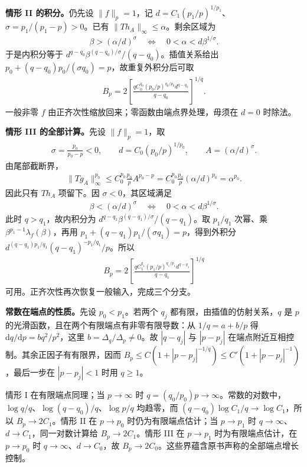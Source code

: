 \documentclass[../../main.tex]{subfiles}
\begin{document}
\begin{remark}
\textbf{情形 II 的积分。}仍先设 $\|f\|_p=1$，记 $d=C_1(p_1/p)^{1/p_1}$、$\sigma=p_1/(p_1-p)>0$。已有 $\|Th_A\|_\infty\leqslant\alpha$。剩余区域为
\begin{align*}
\beta>(\alpha/d)^\sigma\quad\Longleftrightarrow\quad
0<\alpha<d\beta^{1/\sigma}.
\end{align*}
于是内积分等于 $d^{q-q_0}\beta^{(q-q_0)/\sigma}/(q-q_0)$。插值关系给出 $p_0+(q-q_0)p_0/(\sigma q_0)=p$，故重复外积分后可取
\begin{align*}
B_p=2\left[\frac{qC_0^{q_0}(p_0/p)^{q_0/p_0}d^{q-q_0}}{q-q_0}\right]^{1/q}.
\end{align*}
一般非零 $f$ 由正齐次性缩放回来；零函数由端点界处理，毋须在 $d=0$ 时除法。

\textbf{情形 III 的全部计算。}先设 $\|f\|_p=1$，取
\begin{align*}
\sigma=\frac{p_0}{p_0-p}<0,\qquad d=C_0(p_0/p)^{1/p_0},\qquad A=(\alpha/d)^\sigma.
\end{align*}
由尾部截断界，
\begin{align*}
\|Tg_A\|_\infty^{p_0}
\leqslant C_0^{p_0}\frac{p_0}p A^{p_0-p}
=C_0^{p_0}\frac{p_0}p(\alpha/d)^{p_0}=\alpha^{p_0}.
\end{align*}
因此只有 $Th_A$ 项留下。因 $\sigma<0$，其区域满足
\begin{align*}
\beta<(\alpha/d)^\sigma\quad\Longleftrightarrow\quad
0<\alpha<d\beta^{1/\sigma}.
\end{align*}
此时 $q>q_1$，故内积分为 $d^{q-q_1}\beta^{(q-q_1)/\sigma}/(q-q_1)$。取 $p_1/q_1$ 次幂、乘 $\beta^{p_1-1}\lambda_f(\beta)$，再用 $p_1+(q-q_1)p_1/(\sigma q_1)=p$，得到外积分 $d^{(q-q_1)p_1/q_1}(q-q_1)^{-p_1/q_1}/p$。所以
\begin{align*}
B_p=2\left[\frac{qC_1^{q_1}(p_1/p)^{q_1/p_1}d^{q-q_1}}{q-q_1}\right]^{1/q}
\end{align*}
可用。正齐次性再次恢复一般输入，完成三个分支。

\textbf{常数在端点的性质。}先设 $p_0<p_1$。若两个 $q_j$ 都有限，由插值的仿射关系，$q$ 是 $p$ 的光滑函数，且在两个有限端点有非零有限导数：从 $1/q=a+b/p$ 得 $\mathrm dq/\mathrm dp=bq^2/p^2$，这里 $b=\Delta_q/\Delta_p\ne0$。故 $|q-q_j|$ 与 $|p-p_j|$ 在端点附近互相控制。其余正因子有有限界，因而 $B_p\leqslant C(1+|p-p_j|^{-1/q})\leqslant C'(1+|p-p_j|^{-1})$，最后一步在 $|p-p_j|<1$ 时用 $q\geqslant1$。

情形 I 在有限端点同理；当 $p\to\infty$ 时 $q=(q_0/p_0)p\to\infty$。常数的对数中，$\log q/q$、$\log(q-q_0)/q$、$\log p/q$ 均趋零，而 $(q-q_0)\log C_1/q\to\log C_1$，所以 $B_p\to2C_1$。情形 II 在 $p\to p_0$ 时仍为有限端点估计；当 $p\to p_1$ 时 $q\to\infty$、$d\to C_1$，同一对数计算给 $B_p\to2C_1$。情形 III 在 $p\to p_1$ 时为有限端点估计，在 $p\to p_0$ 时 $q\to\infty$、$d\to C_0$，故 $B_p\to2C_0$。这些界蕴含原书声称的全部端点增长控制。


\end{remark}
\end{document}
